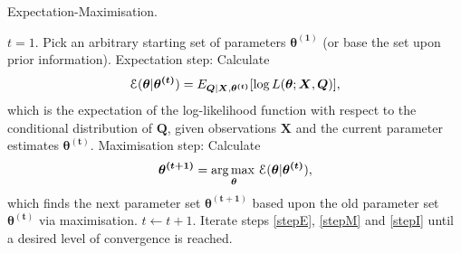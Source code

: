 \documentclass[12pt]{article}
\DeclareMathOperator*{\argmax}{arg\,max\,}
\newcommand\E{{\cal E}}
\begin{document}
\begin{algorithm}
\caption{Expectation-Maximisation.}
\label{alg:EM}
\begin{algorithmic}[1] %
  \STATE $t = 1$.
  \STATE Pick an arbitrary starting set of parameters $\bm{\theta^{(1)}}$ (or base the set upon prior information).
  \STATE Expectation step: Calculate \label{stepE}
  \begin{eqnarray}
    \E(\bm{\theta}|\bm{\theta^{(t)}}) = E_{\bm{Q}|\bm{X},\bm{\theta^{(t)}}}[\log L(\bm{\theta};\bm{X},\bm{Q})],
  \end{eqnarray}
  which is the expectation of the log-likelihood function with respect to the conditional distribution of $\bm{Q}$, given observations $\bm{X}$ and the current parameter estimates $\bm{\theta^{(t)}}$.
  \STATE Maximisation step: Calculate \label{stepM}
    \begin{eqnarray}
      \bm{\theta^{(t+1)}} = \argmax_{\bm{\theta}} \E(\bm{\theta}|\bm{\theta^{(t)}}),
    \end{eqnarray}
    which finds the next parameter set $\bm{\theta^{(t+1)}}$ based upon the old parameter set $\bm{\theta^{(t)}}$ via maximisation.
    \STATE $t \leftarrow t+1$. \label{stepI}
    \STATE Iterate steps \ref{stepE}, \ref{stepM} and \ref{stepI} until a desired level of convergence is reached.
\end{algorithmic}
\end{algorithm}
\end{document}

